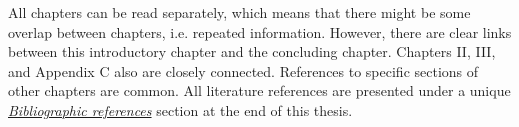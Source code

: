 All chapters can be read separately, which means that there might be some overlap between chapters, 
i.e. repeated information. However, there are clear links between this introductory chapter 
and the concluding chapter. Chapters II, III, and Appendix C also are closely connected. References 
to specific sections of other chapters are common. All literature references are presented under a
unique \hyperref[chap:references]{\textit{Bibliographic references}} section at the end of this
thesis.